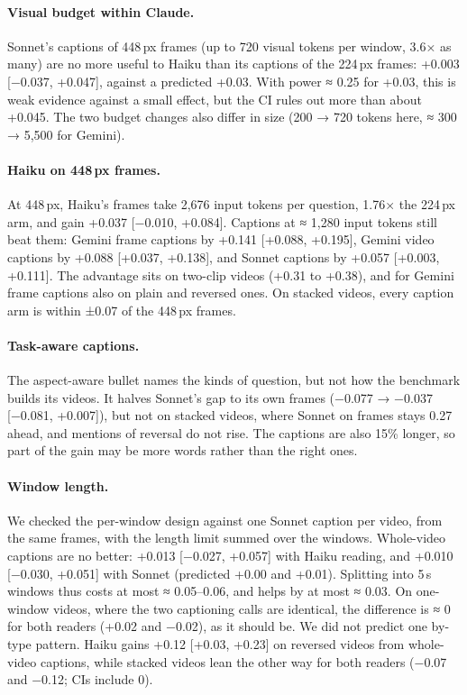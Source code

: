 \documentclass[11pt]{article}
\begin{document}
\paragraph{Visual budget within Claude.} Sonnet's captions of 448\,px frames (up to 720 visual tokens per window, 3.6× as many) are no more useful to Haiku than its captions of the 224\,px frames: +0.003 [−0.037, +0.047], against a predicted +0.03. With power ≈ 0.25 for +0.03, this is weak evidence against a small effect, but the CI rules out more than about +0.045. The two budget changes also differ in size (200 → 720 tokens here, ≈ 300 → 5,500 for Gemini).

\paragraph{Haiku on 448\,px frames.} At 448\,px, Haiku's frames take 2,676 input tokens per question, 1.76× the 224\,px arm, and gain +0.037 [−0.010, +0.084]. Captions at ≈ 1,280 input tokens still beat them: Gemini frame captions by +0.141 [+0.088, +0.195], Gemini video captions by +0.088 [+0.037, +0.138], and Sonnet captions by +0.057 [+0.003, +0.111]. The advantage sits on two-clip videos (+0.31 to +0.38), and for Gemini frame captions also on plain and reversed ones. On stacked videos, every caption arm is within ±0.07 of the 448\,px frames.

\paragraph{Task-aware captions.} The aspect-aware bullet names the kinds of question, but not how the benchmark builds its videos. It halves Sonnet's gap to its own frames (−0.077 → −0.037 [−0.081, +0.007]), but not on stacked videos, where Sonnet on frames stays 0.27 ahead, and mentions of reversal do not rise. The captions are also 15\% longer, so part of the gain may be more words rather than the right ones.

\paragraph{Window length.} We checked the per-window design against one Sonnet caption per video, from the same frames, with the length limit summed over the windows. Whole-video captions are no better: +0.013 [−0.027, +0.057] with Haiku reading, and +0.010 [−0.030, +0.051] with Sonnet (predicted +0.00 and +0.01). Splitting into 5\,s windows thus costs at most ≈ 0.05--0.06, and helps by at most ≈ 0.03. On one-window videos, where the two captioning calls are identical, the difference is ≈ 0 for both readers (+0.02 and −0.02), as it should be. We did not predict one by-type pattern. Haiku gains +0.12 [+0.03, +0.23] on reversed videos from whole-video captions, while stacked videos lean the other way for both readers (−0.07 and −0.12; CIs include 0).
\end{document}
